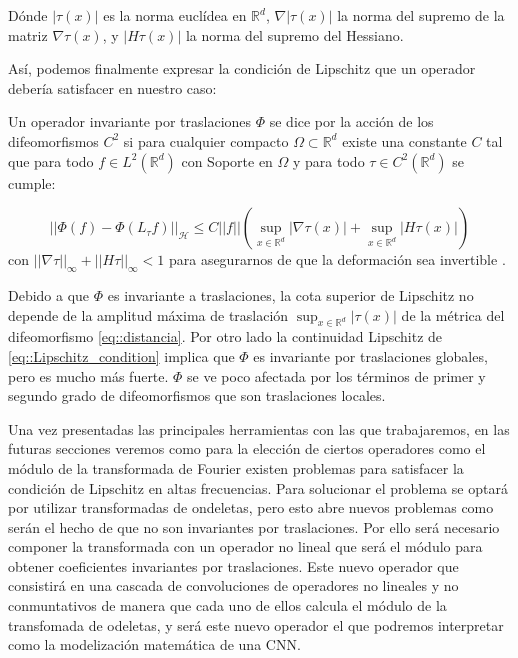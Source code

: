 \noindent Dónde $|\tau (x)|$ es la norma euclídea en $\mathbb{R}^d$, $\nabla |\tau (x)|$ la norma del supremo de la matriz $\nabla \tau (x)$, y $|H \tau (x)|$ la norma del supremo del Hessiano.

\medskip

\noindent Así, podemos finalmente expresar la condición de Lipschitz que un operador debería satisfacer en nuestro caso:  

\medskip

\begin{definicion} \label{def::Lipschitz_cont}
\noindent Un operador invariante por traslaciones $\Phi$ se dice  por la acción de los difeomorfismos $C^2$  si para cualquier compacto $\Omega \subset \mathbb{R}^d$ existe una constante $C$ tal que para todo $f \in L^2(\mathbb{R}^d)$ con Soporte en $\Omega$ y para todo $\tau \in C^2(\mathbb{R}^d)$ se cumple:

\begin{equation} \label{eq::Lipschitz_condition}
  || \Phi(f)-\Phi(L_{\tau}f)||_\mathcal{H} \leq C||f||(\sup_{x \in \mathbb{R}^d} |\nabla \tau (x)| + \sup_{x \in \mathbb{R}^d}|H \tau (x)|)
\end{equation}
con  $|| \nabla \tau ||_\infty + ||H \tau ||_\infty < 1$ para asegurarnos de que la deformación sea invertible \cite{doi:10.1137/S0036141002404838}.
\end{definicion}

\medskip

\noindent Debido a que $\Phi$ es invariante a traslaciones, la cota superior de Lipschitz no depende de la amplitud máxima de traslación $\sup_{x \in \mathbb{R}^d}|\tau (x)|$ de la métrica del difeomorfismo \eqref{eq::distancia}. Por otro lado la continuidad Lipschitz de \eqref{eq::Lipschitz_condition} implica que $\Phi$ es invariante por traslaciones globales, pero es mucho más fuerte. $\Phi$ se ve poco afectada por los términos de primer y segundo grado de difeomorfismos que son traslaciones locales.

\medskip


\noindent Una vez presentadas las principales herramientas con las que trabajaremos, en las futuras secciones veremos como para la elección de ciertos operadores como el módulo de la transformada de Fourier existen problemas para satisfacer la condición de Lipschitz en altas frecuencias. Para solucionar el problema se optará por utilizar transformadas de ondeletas, pero esto abre nuevos problemas como serán el hecho de que no son invariantes por traslaciones. Por ello será necesario componer la transformada con un operador no lineal que será el módulo para obtener coeficientes invariantes por traslaciones. Este nuevo operador que consistirá en una cascada de convoluciones de operadores no lineales y no conmuntativos de manera que cada uno de ellos calcula el módulo de la transfomada de odeletas, y será este nuevo operador el que podremos interpretar como la modelización matemática de una CNN.

